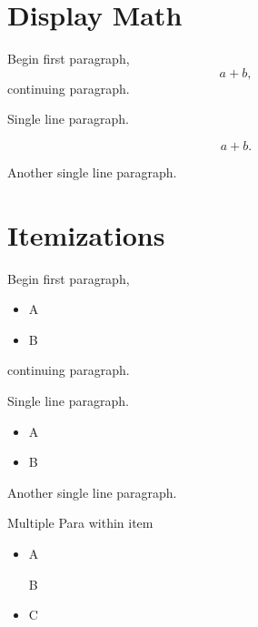 \documentclass{article}
\begin{document}
\section{Display Math}
Begin first paragraph,
\[ a + b, \]
continuing paragraph.

Single line paragraph.

\[ a + b. \]

Another single line paragraph.

\section{Itemizations}
Begin first paragraph,
\begin{itemize}
\item A
\item B
\end{itemize}
continuing paragraph.

Single line paragraph.

\begin{itemize}
\item A
\item B
\end{itemize}

Another single line paragraph.


Multiple Para within item
\begin{itemize}
\item A

B
\item C
\end{itemize}
\end{document}
